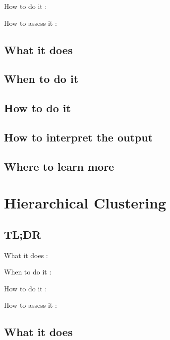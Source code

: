 \documentclass[
]{book}
\begin{document}
How to do it
:

How to assess it
:

\hypertarget{what-it-does-22}{%
\section{What it does}\label{what-it-does-22}}

\hypertarget{when-to-do-it-22}{%
\section{When to do it}\label{when-to-do-it-22}}

\hypertarget{how-to-do-it-22}{%
\section{How to do it}\label{how-to-do-it-22}}

\hypertarget{how-to-interpret-the-output-22}{%
\section{How to interpret the output}\label{how-to-interpret-the-output-22}}

\hypertarget{where-to-learn-more-22}{%
\section{Where to learn more}\label{where-to-learn-more-22}}

\hypertarget{hierarchical-clustering}{%
\chapter{Hierarchical Clustering}\label{hierarchical-clustering}}

\hypertarget{tldr-23}{%
\section{TL;DR}\label{tldr-23}}

What it does
:

When to do it
:

How to do it
:

How to assess it
:

\hypertarget{what-it-does-23}{%
\section{What it does}\label{what-it-does-23}}
\end{document}
